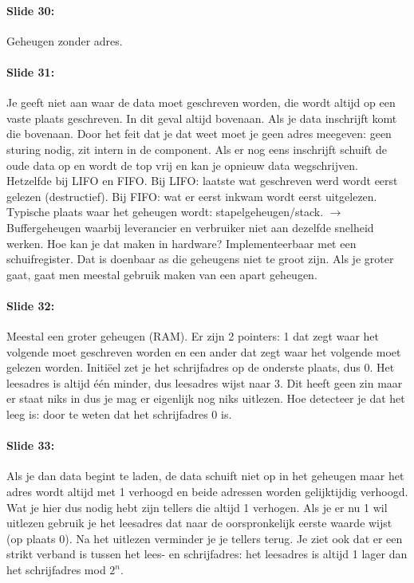 \documentclass[10pt,a4paper]{book}
\begin{document}
\paragraph{Slide 30:} Geheugen zonder adres.

\paragraph{Slide 31:} Je geeft niet aan waar de data moet geschreven worden, die wordt altijd op een vaste plaats geschreven. In dit geval altijd bovenaan. Als je data inschrijft komt die bovenaan. Door het feit dat je dat weet moet je geen adres meegeven: geen sturing nodig, zit intern in de component. Als er nog eens inschrijft schuift de oude data op en wordt de top vrij en kan je opnieuw data wegschrijven.\\
Hetzelfde bij LIFO en FIFO. Bij LIFO: laatste wat geschreven werd wordt eerst gelezen (destructief). Bij FIFO: wat er eerst inkwam wordt eerst uitgelezen. Typische plaats waar het geheugen wordt: stapelgeheugen/stack. $\rightarrow$ Buffergeheugen waarbij leverancier en verbruiker niet aan dezelfde snelheid werken.  Hoe kan je dat maken in hardware? Implementeerbaar met een schuifregister. Dat is doenbaar as die geheugens niet te groot zijn. Als je groter gaat, gaat men meestal gebruik maken van een apart geheugen.

\paragraph{Slide 32:} Meestal een groter geheugen (RAM). Er zijn 2 pointers: 1 dat zegt waar het volgende moet geschreven worden en een ander dat zegt waar het volgende moet gelezen worden. Initi\"eel zet je het schrijfadres op de onderste plaats, dus 0. Het leesadres is altijd \'e\'en minder, dus leesadres wijst naar 3. Dit heeft geen zin maar er staat niks in dus je mag er eigenlijk nog niks uitlezen. Hoe detecteer je dat het leeg is: door te weten dat het schrijfadres 0 is. 

\paragraph{Slide 33:} Als je dan data begint te laden, de data schuift niet op in het geheugen maar het adres wordt altijd met 1 verhoogd en beide adressen worden gelijktijdig verhoogd. Wat je hier dus nodig hebt zijn tellers die altijd 1 verhogen. Als je er nu 1 wil uitlezen gebruik je het leesadres dat naar de oorspronkelijk eerste waarde wijst (op plaats 0). Na het uitlezen verminder je je tellers terug. Je ziet ook dat er een strikt verband is tussen het lees- en schrijfadres: het leesadres is altijd 1 lager dan het schrijfadres mod $2^n$.
\end{document}
